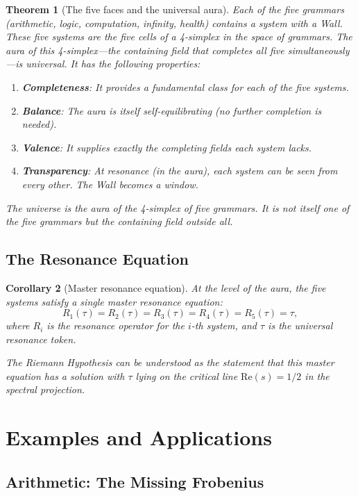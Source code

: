 \documentclass[12pt]{article}
\newtheorem{theorem}{Theorem}[section]
\newtheorem{corollary}[theorem]{Corollary}
\theoremstyle{definition}
\theoremstyle{remark}
\begin{document}
\begin{theorem}[The five faces and the universal aura]
\label{thm:five-faces-universal}
Each of the five grammars (arithmetic, logic, computation, infinity, health) contains a system with a Wall. These five systems are the five cells of a 4-simplex in the space of grammars. The aura of this 4-simplex---the containing field that completes all five simultaneously---is universal. It has the following properties:

\begin{enumerate}
\item \textbf{Completeness}: It provides a fundamental class for each of the five systems.
\item \textbf{Balance}: The aura is itself self-equilibrating (no further completion is needed).
\item \textbf{Valence}: It supplies exactly the completing fields each system lacks.
\item \textbf{Transparency}: At resonance (in the aura), each system can be seen from every other. The Wall becomes a window.
\end{enumerate}

The universe is the aura of the 4-simplex of five grammars. It is not itself one of the five grammars but the containing field outside all.
\end{theorem}

\subsection{The Resonance Equation}

\begin{corollary}[Master resonance equation]
At the level of the aura, the five systems satisfy a single master resonance equation:
\[
R_1(\tau) = R_2(\tau) = R_3(\tau) = R_4(\tau) = R_5(\tau) = \tau,
\]
where $R_i$ is the resonance operator for the $i$-th system, and $\tau$ is the universal resonance token.

The Riemann Hypothesis can be understood as the statement that this master equation has a solution with $\tau$ lying on the critical line $\mathrm{Re}(s) = 1/2$ in the spectral projection.
\end{corollary}

\section{Examples and Applications}

\subsection{Arithmetic: The Missing Frobenius}
\end{document}
